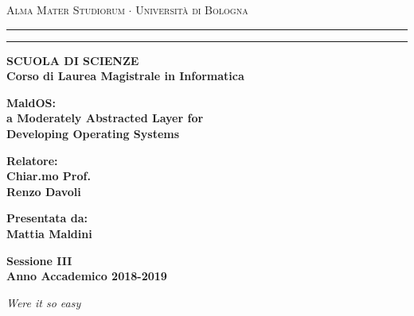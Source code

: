 \documentclass[12pt,a4paper,openright,twoside]{report}
\begin{document}
\begin{titlepage}

\begin{center}
{{\Large{\textsc{Alma Mater Studiorum $\cdot$ Universit\`a di
Bologna}}}} \rule[0.1cm]{15.8cm}{0.1mm}
\rule[0.5cm]{15.8cm}{0.6mm}
{\small{\bf SCUOLA DI SCIENZE\\
Corso di Laurea Magistrale in Informatica }}
\end{center}
\vspace{15mm}
\begin{center}
{\LARGE{\bf MaldOS:}}\\
\vspace{3mm}
{\LARGE{\bf a Moderately Abstracted Layer for}}\\
\vspace{3mm}
{\LARGE{\bf Developing Operating Systems }}\\
\end{center}
\vspace{40mm}
\par
\noindent
\begin{minipage}[t]{0.47\textwidth}
{\large{\bf Relatore:\\
Chiar.mo Prof.\\
Renzo Davoli}}
\end{minipage}
\hfill
\begin{minipage}[t]{0.47\textwidth}\raggedleft
{\large{\bf Presentata da:\\
Mattia Maldini}}
\end{minipage}
\vspace{20mm}
\begin{center}
{\large{\bf Sessione III\\%
Anno Accademico 2018-2019}}%
\end{center}
%
\newpage                                %
\thispagestyle{empty}                   %
\topmargin=6.5cm                        %
\raggedleft                             %
\large                                  %
\em                                     %
Were it so easy
\newpage                                %



\clearpage{\pagestyle{empty}\cleardoublepage}%
\end{titlepage}
\end{document}
